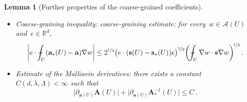 \documentclass[11pt,twoside]{article} %
\numberwithin{equation}{section}
\newtheorem{lemma}[theorem]{Lemma}
\theoremstyle{definition}
\newcommand*{\Rd}{\ensuremath{\mathbb{R}^d}}
\newcommand{\s}{\mathbf{s}}
\renewcommand{\a}{\mathbf{a}}
\def\Xint#1{\mathchoice
{\XXint\displaystyle\textstyle{#1}}%
{\XXint\textstyle\scriptstyle{#1}}%
{\XXint\scriptstyle\scriptscriptstyle{#1}}%
{\XXint\scriptscriptstyle\scriptscriptstyle{#1}}%
\!\int}
\def\XXint#1#2#3{{\setbox0=\hbox{$#1{#2#3}{\int}$}
\vcenter{\hbox{$#2#3$}}\kern-.5\wd0}}
\def\fint{\Xint-}
\newcommand{\A}{\mathcal{A}}
\newcommand{\bfA}{\mathbf{A}}
\begin{document}
\begin{lemma}[Further properties of the coarse-grained coefficients]
\begin{itemize}
\item Coarse-graining inequality: coarse-graining estimate: for every~$w\in \A(U)$ and~$e\in\Rd$, 
\begin{equation}
\label{e.coarse.graining.nosymm}
\biggl| e\cdot \fint_U ( \a_*(U) - \a ) \nabla w \biggr| 
\leq 
2^{\nicefrac12} 
\bigl( e\cdot( \s(U) - \s_*(U))e \bigr)^{\nicefrac12} \biggl( \fint_U \nabla w \cdot \s \nabla w \biggr)^{\!\nicefrac12} 
\,.
\end{equation}

\item
Estimate of the Malliavin derivatives: there exists a constant~$C(d,\lambda,\Lambda)<\infty$ such that
\begin{equation} 
\label{e.maul.Mall}
\bigl| \partial_{\a(U)} \bfA(U) \bigr| + \bigl| \partial_{\a(U)} \bfA_*^{-1}(U) \bigr| \leq C 
 \,.
\end{equation}
\end{itemize}

\end{lemma}
\end{document}
